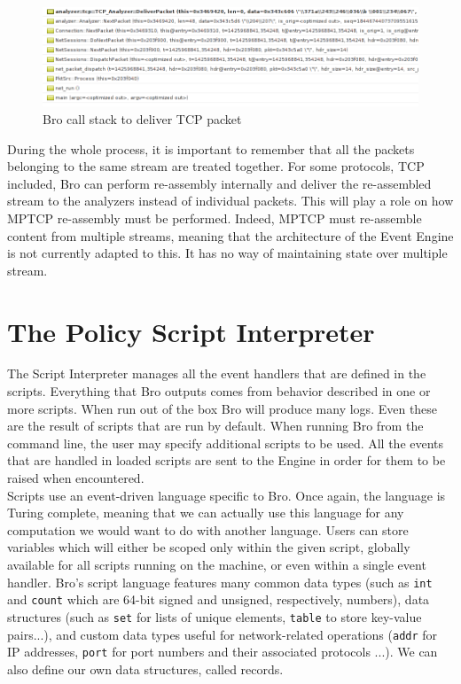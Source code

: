 \begin{figure}[!t]
\centering
\includegraphics[width = \textwidth]{Figures/brodebug.png}
\caption{Bro call stack to deliver TCP packet}
\label{pic:callstack}
\end{figure}

During the whole process, it is important to remember that all the packets belonging to the same stream are treated together. For some protocols, TCP included, Bro can perform re-assembly internally and deliver the re-assembled stream to the analyzers instead of individual packets. This will play a role on how MPTCP re-assembly must be performed. Indeed, MPTCP must re-assemble content from multiple streams, meaning that the architecture of the Event Engine is not currently adapted to this. It has no way of maintaining state over multiple stream.


\section{The Policy Script Interpreter}
The Script Interpreter manages all the event handlers that are defined in the scripts. Everything that Bro outputs comes from behavior described in one or more scripts. When run out of the box Bro will produce many logs. Even these are the result of scripts that are run by default. When running Bro from the command line, the user may specify additional scripts to be used. All the events that are handled in loaded scripts are sent to the Engine in order for them to be raised when encountered. \\

Scripts use an event-driven language specific to Bro. Once again, the language is Turing complete, meaning that we can actually use this language for any computation we would want to do with another language. Users can store variables which will either be scoped only within the given script, globally available for all scripts running on the machine, or even within a single event handler. Bro's script language features many common data types (such as \texttt{int} and \texttt{count}  which are 64-bit signed and unsigned, respectively, numbers), data structures (such as \texttt{set} for lists of unique elements, \texttt{table} to store key-value pairs...), and custom data types useful for network-related operations (\texttt{addr} for IP addresses, \texttt{port} for port numbers and their associated protocols ...). We can also define our own data structures, called records. \\

